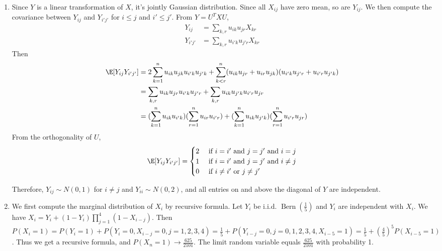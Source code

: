 \documentclass{article}
\DeclareMathOperator{\Bern}{Bern}
\begin{document}
\courseheader
{}

\begin{enumerate}
\item Since $Y$ is a linear transformation
of $X$, it's jointly Gaussian distribution.
Since all $X_{ij}$ have zero mean, so are
$Y_{ij}$. We then compute the covariance
between $Y_{ij}$ and $Y_{i'j'}$
for $i \leq j$ and $i' \leq j'$.
From $Y=U^T X U$,
\begin{align*}
    Y_{ij} &= \sum_{k,r} u_{ik} u_{jr} X_{kr}\\
    Y_{i'j'} &= \sum_{k,r} u_{i'k} u_{j'r} X_{kr}
\end{align*}
Then
\begin{align*}
    \E[Y_{ij} Y_{i'j'} ]
    &= 2 \sum_{k=1}^n u_{ik} u_{jk}
    u_{i'k} u_{j'k}
    +\sum_{k<r}^n (u_{ik} u_{jr}
     + u_{ir} u_{jk})(u_{i'k} u_{j'r}+
    u_{i'r} u_{j'k}) \\
    &= \sum_{k,r} u_{ik} u_{jr}
    u_{i'k} u_{j'r}
    + \sum_{k,r} u_{ik} u_{j'k}
    u_{i'r} u_{jr} \\
    &=(\sum_{k=1}^n u_{ik}
    u_{i'k})(\sum_{r=1}^n u_{ir}
    u_{i'r})
    + (\sum_{k=1}^n u_{ik}
    u_{j'k})(\sum_{r=1}^n u_{i'r}
    u_{jr})
\end{align*}
From the orthogonality of $U$,
\begin{equation*}
\E[Y_{ij} Y_{i'j'} ]
= \begin{cases}
2 & \textrm{ if } i=i' \textrm{ and } j=j' \textrm{ and } i=j\\
1 & \textrm{ if } i=i' \textrm{ and } j=j' \textrm{ and } i\neq j\\
0  & \textrm{ if } i\neq i' \textrm{ or } j\neq j'
\end{cases}
\end{equation*}

Therefore, $Y_{ij}\sim N(0,1)$ for $i\neq j$
and $Y_{ii} \sim N(0,2)$,
and all entries on and above the diagonal of
$Y$ are independent.
\item We first compute the marginal distribution
of $X_i$ by recursive formula.
Let $Y_i$ be i.i.d. $\Bern(\frac{1}{5})$ and $Y_i$
are independent with $X_i$.
We have $X_i = Y_i + (1-Y_i)\prod_{j=1}^4(1-X_{i-j})$.
Then $P(X_i = 1)=P(Y_i=1) + P(Y_i=0,X_{i-j}=0,j=1,2,3,4)
=\frac{1}{5}+P(Y_{i-j}=0,j=0,1,2,3,4, X_{i-5}=1)
=\frac{1}{5}+(\frac{4}{5})^5 P(X_{i-5}=1)$.
Thus we get a recursive formula, and
$P(X_n=1)\to \frac{625}{2101}$. The limit random
variable equals $\frac{625}{2101}$ with probability
1.


\end{enumerate}
\end{document}
